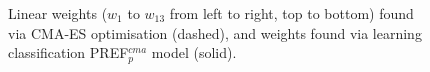 \documentclass[smallextended]{llncs}
\newcommand{\PREF}[2]{PREF$_{#2}^{#1}$}
\begin{document}
\begin{figure}\centering
{}
\caption{Linear weights ($w_1$ to $w_{13}$ from left to right, top to bottom) found via CMA-ES optimisation (dashed), and weights found via learning classification \PREF{cma}{p} model (solid). }\label{fig:weights}
\end{figure}
\end{document}
